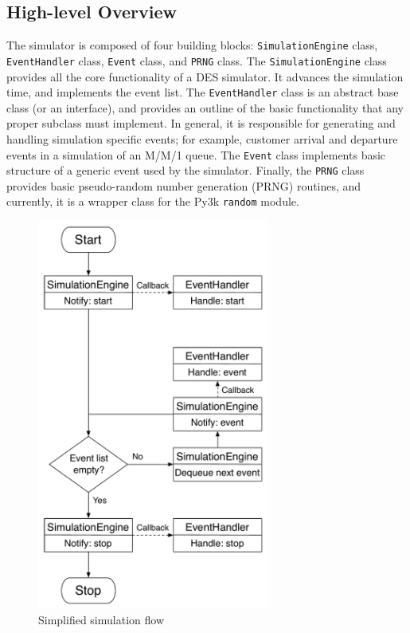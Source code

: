 \subsection{High-level Overview}
\label{sub:high_level_overview_simappendix}
The simulator is composed of four building blocks: \lstinline{SimulationEngine} class, \lstinline{EventHandler} class, \lstinline{Event} class, and \lstinline{PRNG} class. The \lstinline{SimulationEngine} class provides all the core functionality of a DES simulator. It advances the simulation time, and implements the event list. The \lstinline{EventHandler} class is an abstract base class (or an interface), and provides an outline of the basic functionality that any proper subclass must implement. In general, it is responsible for generating and handling simulation specific events; for example, customer arrival and departure events in a simulation of an M/M/1 queue. The \lstinline{Event} class implements basic structure of a generic event used by the simulator. Finally, the \lstinline{PRNG} class provides basic pseudo-random number generation (PRNG) routines, and currently, it is a wrapper class for the Py3k \lstinline{random} module.

\begin{figure}[t]
  \includegraphics[width=3in]{Appendices/Figures/simulation_flow}
  \caption{Simplified simulation flow}
  \label{fig:simulation_flow_simappendix}
\end{figure}

